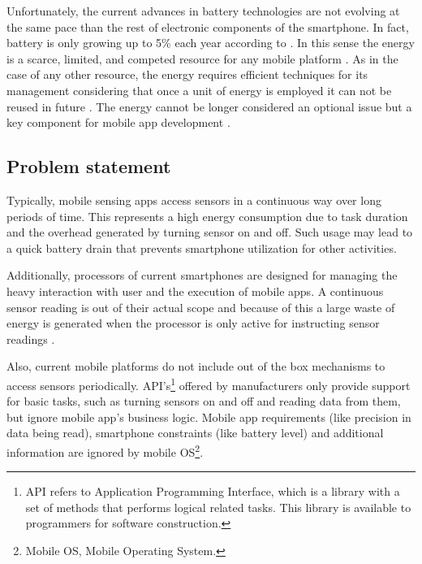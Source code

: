 Unfortunately, the current advances in battery technologies are not evolving at the same pace than the rest of electronic components \cite{Yurur2014} of the smartphone. In fact, battery is only growing up to 5\% each year according to \cite{Ma2012}.
In this sense the energy is a scarce, limited, and competed resource for any mobile platform \cite{Perez-Torres2012}.
As in the case of any other resource, the energy requires efficient techniques for its management considering that once a unit of energy is employed it can not be reused in future \cite{Vallina-Rodriguez2013}.
The energy cannot be longer considered an optional issue but a key component for mobile app development \cite{Man2014}.

\subsection{Problem statement} 
\label{sub:problem_statement}
Typically, mobile sensing apps access sensors in a continuous way over long periods of time.
This represents a high energy consumption due to task duration and the overhead generated by turning sensor on and off. Such usage may lead to a quick battery drain that prevents smartphone utilization for other activities.

Additionally, processors of current smartphones are designed for managing the heavy interaction with user and the execution of mobile apps.
A continuous sensor reading is out of their actual scope and because of this a large waste of energy is generated when the processor is only active for instructing sensor readings \cite{Priyantha2011}.


Also, current mobile platforms do not include out of the box mechanisms to access sensors periodically.
API’s\footnote{API refers to Application Programming Interface, which is a library with a set of methods that performs logical related tasks. This library is available to programmers for software construction.} offered by manufacturers only provide support for basic tasks, such as turning sensors on and off and reading data from them, but ignore mobile app’s business logic.
Mobile app requirements (like precision in data being read), smartphone constraints (like battery level) and additional information are ignored by mobile OS\footnote{Mobile OS, Mobile Operating System.}.



